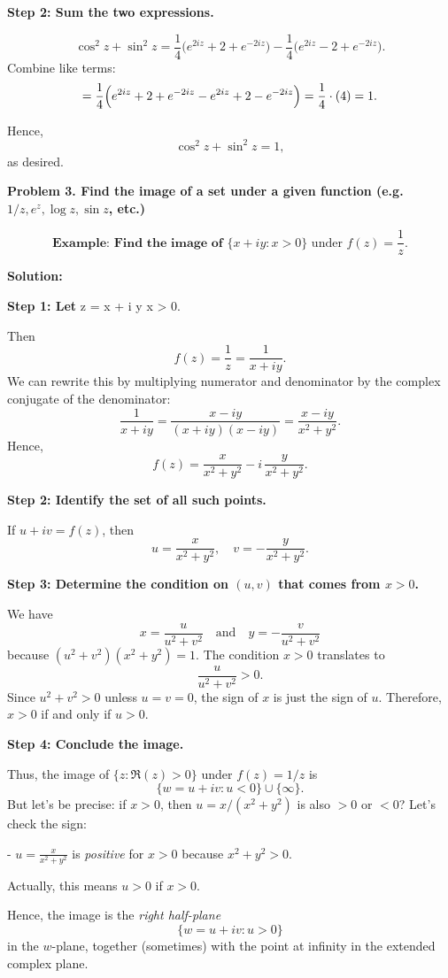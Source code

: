 \documentclass[12pt]{article}
\theoremstyle{definition} %
\theoremstyle{plain} %
\begin{document}
\textbf{Step 2: Sum the two expressions.}

\[
\cos^2 z + \sin^2 z 
= \frac{1}{4}\bigl(e^{2iz} + 2 + e^{-2iz}\bigr)
-\frac{1}{4}\bigl(e^{2iz} - 2 + e^{-2iz}\bigr).
\]
Combine like terms:
\[
= \frac{1}{4}\Bigl(e^{2iz} + 2 + e^{-2iz} - e^{2iz} + 2 - e^{-2iz}\Bigr)
= \frac{1}{4}\cdot(4) = 1.
\]

Hence,
\[
\cos^2 z + \sin^2 z = 1,
\]
as desired.

\textbf{Problem 3. Find the image of a set under a given function (e.g.\ $1/z, e^z, \log z, \sin z$, etc.)}

\[
\textbf{Example: Find the image of } \{x + i y : x > 0\} \text{ under } f(z) = \frac{1}{z}.
\]

\textbf{Solution:}

\textbf{Step 1: Let } z = x + i y  x > 0.

Then
\[
f(z) = \frac{1}{z} = \frac{1}{x + i y}.
\]
We can rewrite this by multiplying numerator and denominator by the complex conjugate of the denominator:
\[
\frac{1}{x + i y} = \frac{x - i y}{(x + i y)(x - i y)} = \frac{x - i y}{x^2 + y^2}.
\]
Hence,
\[
f(z) = \frac{x}{x^2 + y^2} - i\,\frac{y}{x^2 + y^2}.
\]

\textbf{Step 2: Identify the set of all such points.}

If $u + i v = f(z)$, then
\[
u = \frac{x}{x^2 + y^2}, 
\quad 
v = -\frac{y}{x^2 + y^2}.
\]

\textbf{Step 3: Determine the condition on $(u, v)$ that comes from $x > 0$.}

We have
\[
x = \frac{u}{u^2 + v^2} 
\quad \text{and} \quad
y = -\frac{v}{u^2 + v^2}
\]
because $(u^2 + v^2)(x^2 + y^2) = 1$. The condition $x > 0$ translates to 
\[
\frac{u}{u^2 + v^2} > 0.
\]
Since $u^2 + v^2 > 0$ unless $u = v = 0$, the sign of $x$ is just the sign of $u$. Therefore, $x>0$ if and only if $u>0$.

\textbf{Step 4: Conclude the image.}

Thus, the image of $\{z : \Re(z) > 0\}$ under $f(z) = 1/z$ is 
\[
\{ w = u + i v : u < 0 \} \cup \{\infty\}.
\]
But let's be precise: if $x > 0$, then $u = x/(x^2+y^2)$ is also $> 0$ or $< 0$? Let's check the sign:

- $u = \frac{x}{x^2+y^2}$ is \emph{positive} for $x>0$ because $x^2+y^2>0$. 

Actually, this means $u > 0$ if $x>0$. 

Hence, the image is the \emph{right half-plane}
\[
\{ w = u + iv : u > 0\} 
\]
in the $w$-plane, together (sometimes) with the point at infinity in the extended complex plane. 
\end{document}
